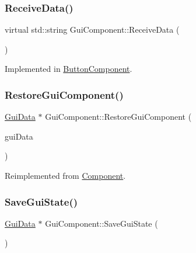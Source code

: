\mbox{\label{class_gui_component_ad136b2da6c63d7d3147f6cc411696cfe}} 
\subsubsection{\texorpdfstring{ReceiveData()}{ReceiveData()}}
{\footnotesize\ttfamily virtual std\+::string Gui\+Component\+::\+Receive\+Data (\begin{DoxyParamCaption}\item[{const std\+::string \&}]{ }\end{DoxyParamCaption})\hspace{0.3cm}{\ttfamily [pure virtual]}}



Implemented in \mbox{\hyperlink{class_button_component_a2f8433707fbd9c184ba359bc41f49305}{Button\+Component}}.

\mbox{\label{class_gui_component_a6721cce20f5628d9413784b10a48b359}} 
\subsubsection{\texorpdfstring{RestoreGuiComponent()}{RestoreGuiComponent()}}
{\footnotesize\ttfamily \mbox{\hyperlink{class_gui_data}{Gui\+Data}} $\ast$ Gui\+Component\+::\+Restore\+Gui\+Component (\begin{DoxyParamCaption}\item[{\mbox{\hyperlink{class_gui_data}{Gui\+Data}} $\ast$}]{gui\+Data }\end{DoxyParamCaption})\hspace{0.3cm}{\ttfamily [virtual]}}



Reimplemented from \mbox{\hyperlink{class_component_a0a1e8b4aaa523ad8b6460ff35dd6c584}{Component}}.

\mbox{\label{class_gui_component_af41e8f80eeca9b258649c7579a7e8c5c}} 
\subsubsection{\texorpdfstring{SaveGuiState()}{SaveGuiState()}}
{\footnotesize\ttfamily \mbox{\hyperlink{class_gui_data}{Gui\+Data}} $\ast$ Gui\+Component\+::\+Save\+Gui\+State (\begin{DoxyParamCaption}{ }\end{DoxyParamCaption})\hspace{0.3cm}{\ttfamily [virtual]}}




